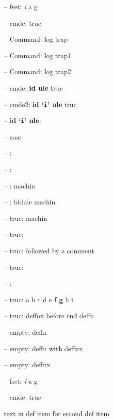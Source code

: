\documentclass{book}
\begin{document}
\begin{titlepage}
\hbox{}-- fset: \emph{i} a g


%
%
\hbox{}-- cmde: truc 


%
\hbox{}-- Command: log trap 


%
\hbox{}-- Command: log trap1 


%
\hbox{}-- Command: log trap2 


%
\hbox{}-- cmde: \textbf{id ule} truc


%
\hbox{}-- cmde2: \textbf{id `\texttt{i}' ule} truc


%
\hbox{}-- \textbf{id `\texttt{i}' ule}: 



\hbox{}-- aaa: 


\hbox{}-- : 


\hbox{}-- : 


\hbox{}-- : machin


%
\hbox{}-- : bidule machin


%
\hbox{}-- truc: machin


%
\hbox{}-- truc: 


\hbox{}-- truc: followed by a comment


%
\hbox{}-- truc: 


\hbox{}-- : 


\hbox{}-- truc: a b c d e \textbf{f g} h i


%
\hbox{}-- truc: deffnx before end deffn


%

\hbox{}-- empty: deffn


%

\hbox{}-- empty: deffn with deffnx


%
\hbox{}-- empty: deffnx


%

\hbox{}-- fset: \emph{i} a g


%
\hbox{}-- cmde: truc 


%
text in def item for second def item


\end{titlepage}
\end{document}
